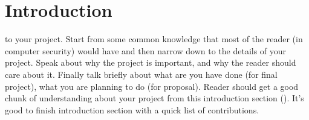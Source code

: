\section{Introduction}
\label{sec:intro}

 to your project. Start from some common knowledge that most of the
reader (in computer security) would have and then narrow down to the details of
your project. Speak about why the project is important, and why the reader
should care about it. Finally talk briefly about what are you have done (for
final project), what you are planning to do (for proposal). Reader should get a
good chunk of understanding about your project from this introduction section
().
It's good to finish introduction section with a quick list of contributions. 






